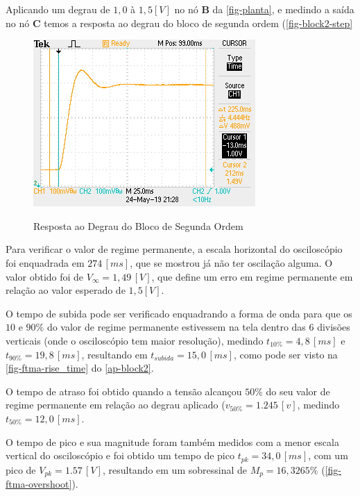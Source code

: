 \documentclass[
	12pt,				%
	article,			%
	openright,			%
	oneside,
	a4paper,			%
	chapter=TITLE,		%
	section=TITLE,		%
	english,			%
	french,				%
	spanish,			%
	brazil,				%
]{abntex2}
\begin{document}
        	Aplicando um degrau de $1,0$ à $1,5[V]$ no nó \textbf{B} da \autoref{fig-planta}, e medindo a saída no nó \textbf{C} temos a resposta ao degrau do bloco de segunda ordem (\autoref{fig-block2-step}
        	
        	\begin{figure}[htbp]
            	\centering
            	\caption{Resposta ao Degrau do Bloco de Segunda Ordem}
            	\includegraphics[width=\textwidth,height=240px,keepaspectratio]{imgs/block2/step_response.JPG}
            	\label{fig-block2-step}
        	\end{figure}
        	
        	Para verificar o valor de regime permanente, a escala horizontal do osciloscópio foi enquadrada em $274\,[ms]$, que se mostrou já não ter oscilação alguma. O valor obtido foi de $V_{\infty}=1,49\,[V]$, que define um erro em regime permanente em relação ao valor esperado de $1,5 [V]$.
        	
        	O tempo de subida pode ser verificado enquadrando a forma de onda para que os $10$ e $90\%$  do valor de  regime permanente estivessem na  tela dentro das 6 divisões verticais (onde o osciloscópio tem maior resolução), medindo $t_{10\%}=4,8\,[ms]$ e  $t_{90\%}=19,8\,[ms]$, resultando em  $t_{subida}=15,0\,[ms]$, como pode ser visto na \autoref{fig-ftma-rise_time} do \autoref{ap-block2}.
        	
        	O tempo de atraso foi obtido quando a tensão alcançou $50\%$ do seu valor de regime permanente em relação ao degrau aplicado ($v_{50\%}=1.245\,[v]$, medindo $t_{50\%}=12,0\,[ms]$.
        	
        	O tempo de pico e sua magnitude foram também medidos com a menor escala vertical do osciloscópio e foi obtido um tempo de pico $t_{pk}=34,0\,[ms]$, com um pico de $V_{pk}=1.57\,[V]$, resultando em um sobressinal de $M_{p}=16,3265\%$ (\autoref{fig-ftma-overshoot}).
        	
\end{document}
